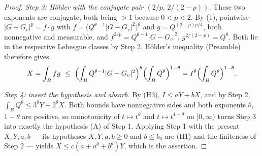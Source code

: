 \begin{proof}
\emph{Step 3: Hölder with the conjugate pair $(2/p,\,2/(2-p))$.}  These two
exponents are conjugate, both being $>1$ because $0<p<2$.  By (1), pointwise
$|G-G_v|^p=f\cdot g$ with
$f=\bigl(Q^{\theta-1}|G-G_v|^2\bigr)^{\theta}$ and
$g=Q^{(2-p)p/4}$, both nonnegative and measurable, and
$f^{2/p}=Q^{\theta-1}|G-G_v|^2$, $g^{2/(2-p)}=Q^{\theta}$.  Both lie in the
respective Lebesgue classes by Step 2.  Hölder's inequality (Preamble) therefore
gives
\[
X=\int_Bfg\ \le\ \Bigl(\int_BQ^{\theta-1}|G-G_v|^2\Bigr)^{\theta}
   \Bigl(\int_BQ^{\theta}\Bigr)^{1-\theta}
 = I^{\theta}\Bigl(\int_BQ^{\theta}\Bigr)^{1-\theta}.
\]

\emph{Step 4: insert the hypothesis and absorb.}  By (H3), $I\le aY+bX$, and by
Step 2, $\int_BQ^{\theta}\le3^{\theta}Y+2^{\theta}X$.  Both bounds have
nonnegative sides and both exponents $\theta$, $1-\theta$ are positive, so
monotonicity of $t\mapsto t^{\theta}$ and $t\mapsto t^{1-\theta}$ on
$[0,\infty)$ turns Step 3 into exactly the hypothesis (A) of Step 1.  Applying
Step 1 with the present $X,Y,a,b$ --- its hypotheses $X,Y,a,b\ge0$ and
$b\le b_0$ are (H1) and the finiteness of Step 2 --- yields
$X\le c(a+a^{\theta}+b^{\theta})Y$, which is the assertion.
\end{proof}

